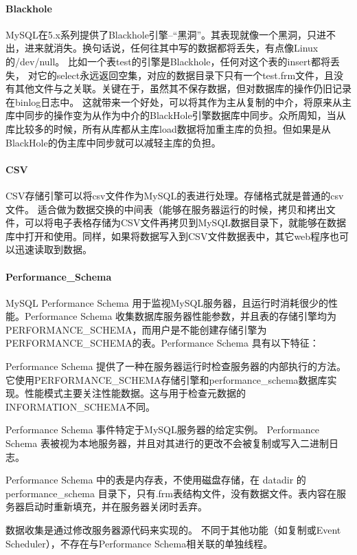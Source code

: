 \documentclass[../../../interview-questions.tex]{subfiles}
\begin{document}
\paragraph{Blackhole}

MySQL在5.x系列提供了Blackhole引擎–“黑洞”。其表现就像一个黑洞，只进不出，进来就消失。换句话说，任何往其中写的数据都将丢失，有点像Linux的/dev/null。
比如一个表test的引擎是Blackhole，任何对这个表的insert都将丢失，
对它的select永远返回空集，对应的数据目录下只有一个test.frm文件，且没有其他文件与之关联。关键在于，虽然其不保存数据，但对数据库的操作仍旧记录在binlog日志中。
这就带来一个好处，可以将其作为主从复制的中介，将原来从主库中同步的操作变为从作为中介的BlackHole引擎数据库中同步。众所周知，当从库比较多的时候，所有从库都从主库load数据将加重主库的负担。但如果是从BlackHole的伪主库中同步就可以减轻主库的负担。


\paragraph{CSV}

CSV存储引擎可以将csv文件作为MySQL的表进行处理。存储格式就是普通的csv文件。    适合做为数据交换的中间表（能够在服务器运行的时候，拷贝和拷出文件，可以将电子表格存储为CSV文件再拷贝到MySQL数据目录下，就能够在数据库中打开和使用。同样，如果将数据写入到CSV文件数据表中，其它web程序也可以迅速读取到数据。


\paragraph{Performance\_Schema}

MySQL Performance Schema  用于监视MySQL服务器，且运行时消耗很少的性能。Performance Schema 收集数据库服务器性能参数，并且表的存储引擎均为PERFORMANCE\_SCHEMA，而用户是不能创建存储引擎为PERFORMANCE\_SCHEMA的表。Performance Schema 具有以下特征：

Performance Schema 提供了一种在服务器运行时检查服务器的内部执行的方法。它使用PERFORMANCE\_SCHEMA存储引擎和performance\_schema数据库实现。性能模式主要关注性能数据。这与用于检查元数据的INFORMATION\_SCHEMA不同。

Performance Schema 事件特定于MySQL服务器的给定实例。 Performance Schema 表被视为本地服务器，并且对其进行的更改不会被复制或写入二进制日志。

Performance Schema 中的表是内存表，不使用磁盘存储，在 datadir 的 performance\_schema 目录下，只有.frm表结构文件，没有数据文件。表内容在服务器启动时重新填充，并在服务器关闭时丢弃。

数据收集是通过修改服务器源代码来实现的。 不同于其他功能（如复制或Event Scheduler），不存在与Performance Schema相关联的单独线程。
\end{document}
